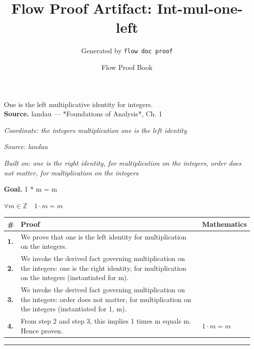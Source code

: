 \documentclass[11pt]{article}
\title{Flow Proof Artifact: Int-mul-one-left}
\author{Generated by \texttt{flow doc proof}}
\date{Flow Proof Book}
\theoremstyle{definition}
\begin{document}
\maketitle
One is the left multiplicative identity for integers.\\[0.5em]
\textbf{Source.} landau — *Foundations of Analysis*, Ch. 1\\[0.5em]
\bigskip
{}\par
\smallskip\noindent\textit{Coordinate: the integers \cdot multiplication \cdot one is the left identity}\par
\smallskip\noindent\textit{Source: landau}\par
\smallskip\noindent\textit{Built on: one is the right identity, for multiplication on the integers, order does not matter, for multiplication on the integers}\par
\medskip
\noindent\textbf{Goal.} 1 * m = m\par
\noindent$\displaystyle \forall m \in \mathbb{Z}\quad 1 \cdot m = m$\par
\medskip
\noindent
\begin{tabular}{@{} >{\raggedright\arraybackslash}p{} >{\raggedright\arraybackslash}p{} >{\raggedleft\arraybackslash}p{} @{}}
\textbf{\#} & \textbf{Proof} & \textbf{Mathematics} \\
\midrule
\textbf{1.} & We prove that one is the left identity for multiplication on the integers. & \\[0.45em]
\textbf{2.} & We invoke the derived fact governing multiplication on the integers: one is the right identity, for multiplication on the integers (instantiated for m). & \\[0.45em]
\textbf{3.} & We invoke the derived fact governing multiplication on the integers: order does not matter, for multiplication on the integers (instantiated for 1, m). & \\[0.45em]
\textbf{4.} & From step 2 and step 3, this implies 1 times m equals m. Hence proven. & $\displaystyle 1 \cdot m = m$ \\[0.45em]
\bottomrule
\end{tabular}
\label{thm:Int-multiplication-one_is_the_left_identity}
\par\medskip\hrule
\end{document}
